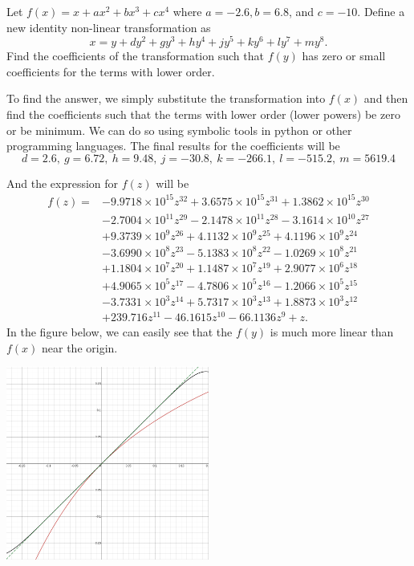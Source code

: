 \begin{example}
	Let $f(x) = x+ax^{2}+bx^{3}+cx^{4}$ where $a=-2.6, b=6.8$, and $c=-10$. Define a new identity non-linear transformation as 
	\[ x = y+dy^{2}+gy^{3}+hy^{4}+jy^{5}+ky^{6}+ly^{7}+my^{8}. \]
	Find the coefficients of the transformation such that $f(y)$ has zero or small coefficients for the terms with lower order. 
	
	\begin{ans}
		To find the answer, we simply substitute the transformation into $f(x)$ and then find the coefficients such that the terms with lower order (lower powers) be zero or be minimum. We can do so using symbolic tools in python or other programming languages. The final results for the coefficients will be
		\[ d=2.6,\ g=6.72,\ h=9.48,\ j=−30.8,\ k=−266.1,\ l=−515.2,\ m=5619.4  \]
		
		And the expression for $f(z)$ will be
		\begin{align*}
			f(z) = & -9.9718 \times 10^{15} z^{32} + 3.6575 \times 10^{15} z^{31} + 1.3862 \times 10^{15} z^{30} \\
			& - 2.7004 \times 10^{11} z^{29} - 2.1478 \times 10^{11} z^{28} - 3.1614 \times 10^{10} z^{27} \\
			& + 9.3739 \times 10^{9} z^{26} + 4.1132 \times 10^{9} z^{25} + 4.1196 \times 10^{9} z^{24} \\
			& - 3.6990 \times 10^{8} z^{23} - 5.1383 \times 10^{8} z^{22} - 1.0269 \times 10^{8} z^{21} \\
			& + 1.1804 \times 10^{7} z^{20} + 1.1487 \times 10^{7} z^{19} + 2.9077 \times 10^{6} z^{18} \\
			& + 4.9065 \times 10^{5} z^{17} - 4.7806 \times 10^{5} z^{16} - 1.2066 \times 10^{5} z^{15} \\
			& - 3.7331 \times 10^{3} z^{14} + 5.7317 \times 10^{3} z^{13} + 1.8873 \times 10^{3} z^{12} \\
			& + 239.716 z^{11} - 46.1615 z^{10} - 66.1136 z^{9} + z.
		\end{align*}
		In the figure below, we can easily see that the $f(y)$ is much more linear than $f(x)$ near the origin. 
		\begin{center}
			\includegraphics[width=0.5\textwidth]{Images/NearIdentityTransformation.png}
		\end{center}
	\end{ans}
\end{example}

